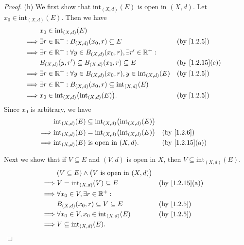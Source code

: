 \begin{proof}{(h)}
  We first show that \(\text{int}_{(X, d)}(E)\) is open in \((X, d)\).
  Let \(x_0 \in \text{int}_{(X, d)}(E)\).
  Then we have
  \begin{align*}
             & x_0 \in \text{int}_{(X, d)}(E)                                                                                        \\
    \implies & \exists r \in \R^+ : B_{(X, d)}(x_0, r) \subseteq E                                 &  & \by{1.2.5}                   \\
    \implies & \exists r \in \R^+ : \forall y \in B_{(X, d)}(x_0, r), \exists r' \in \R^+ :                                          \\
             & B_{(X, d)}(y, r') \subseteq B_{(X, d)}(x_0, r) \subseteq E                          &  & \text{(by \cref{1.2.15}(c))} \\
    \implies & \exists r \in \R^+ : \forall y \in B_{(X, d)}(x_0, r), y \in \text{int}_{(X, d)}(E) &  & \by{1.2.5}                   \\
    \implies & \exists r \in \R^+ : B_{(X, d)}(x_0, r) \subseteq \text{int}_{(X, d)}(E)                                              \\
    \implies & x_0 \in \text{int}_{(X, d)}\big(\text{int}_{(X, d)}(E)\big).                        &  & \by{1.2.5}
  \end{align*}
  Since \(x_0\) is arbitrary, we have
  \begin{align*}
             & \text{int}_{(X, d)}(E) \subseteq \text{int}_{(X, d)}\big(\text{int}_{(X, d)}(E)\big)                                   \\
    \implies & \text{int}_{(X, d)}(E) = \text{int}_{(X, d)}\big(\text{int}_{(X, d)}(E)\big)         &  & \by{1.2.6}                   \\
    \implies & \text{int}_{(X, d)}(E) \text{ is open in } (X, d).                                   &  & \text{(by \cref{1.2.15}(a))}
  \end{align*}

  Next we show that if \(V \subseteq E\) and \((V, d)\) is open in \(X\), then \(V \subseteq \text{int}_{(X, d)}(E)\).
  \begin{align*}
             & (V \subseteq E) \land \big(V \text{ is open in } (X, d)\big)                                   \\
    \implies & V = \text{int}_{(X, d)}(V) \subseteq E                       &  & \text{(by \cref{1.2.15}(a))} \\
    \implies & \forall x_0 \in V, \exists r \in \R^+ :                                                        \\
             & B_{(X, d)}(x_0, r) \subseteq V \subseteq E                   &  & \by{1.2.5}                   \\
    \implies & \forall x_0 \in V, x_0 \in \text{int}_{(X, d)}(E)            &  & \by{1.2.5}                   \\
    \implies & V \subseteq \text{int}_{(X, d)}(E).
  \end{align*}


\end{proof}
